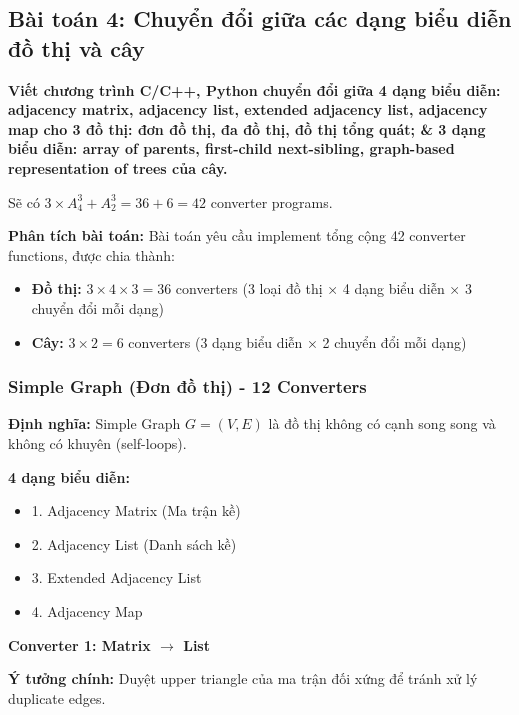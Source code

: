 \documentclass[12pt,a4paper]{article}
\begin{document}
\subsection{Bài toán 4: Chuyển đổi giữa các dạng biểu diễn đồ thị và cây}

\begin{problembox}
    \textbf{Viết chương trình C/C++, Python chuyển đổi giữa 4 dạng biểu diễn: adjacency matrix, adjacency list, extended adjacency list, adjacency map cho 3 đồ thị: đơn đồ thị, đa đồ thị, đồ thị tổng quát; \& 3 dạng biểu diễn: array of parents, first-child next-sibling, graph-based representation of trees của cây.} 
    
    Sẽ có $3 \times A_4^3 + A_2^3 = 36 + 6 = 42$ converter programs.

\end{problembox}

\textbf{Phân tích bài toán:} Bài toán yêu cầu implement tổng cộng 42 converter functions, được chia thành:

\begin{itemize}
    \item \textbf{Đồ thị:} $3 \times 4 \times 3 = 36$ converters (3 loại đồ thị × 4 dạng biểu diễn × 3 chuyển đổi mỗi dạng)
    \item \textbf{Cây:} $3 \times 2 = 6$ converters (3 dạng biểu diễn × 2 chuyển đổi mỗi dạng)
\end{itemize}

\subsubsection{Simple Graph (Đơn đồ thị) - 12 Converters}

\textbf{Định nghĩa:} Simple Graph $G = (V, E)$ là đồ thị không có cạnh song song và không có khuyên (self-loops).
\vspace{0.5cm}

\textbf{4 dạng biểu diễn:}
\begin{itemize}[label=\textbullet]
    \item 1. Adjacency Matrix (Ma trận kề)
    \item 2. Adjacency List (Danh sách kề)
    \item 3. Extended Adjacency List
    \item 4. Adjacency Map
\end{itemize}

\textbf{Converter 1: Matrix $\rightarrow$ List}

\textbf{Ý tưởng chính:} Duyệt upper triangle của ma trận đối xứng để tránh xử lý duplicate edges.
\end{document}
